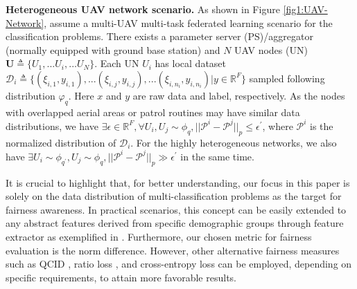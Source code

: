 \documentclass[lettersize,journal]{IEEEtran}
\begin{document}
\textbf{Heterogeneous UAV network scenario.} 
As shown in Figure \ref{fig1:UAV-Network}, assume a multi-UAV multi-task federated learning scenario for the classification problems. There exists a parameter server (PS)/aggregator (normally equipped with ground base station) and $N$ UAV nodes (UN) $\mathbf{U}\triangleq\{U_1,...U_i,...U_N\}$. Each UN $U_i$ has local dataset $\mathcal{D}_i\triangleq\{(\xi_{i,1},y_{i,1}),...(\xi_{i,j},y_{i,j}),...(\xi_{i,n_i},y_{i,n_i})|y\in \mathbb{R}^F\}$ sampled following distribution $\varphi_q$. %
Here $x$ and $y$ are raw data and label, respectively. As the nodes with overlapped aerial areas or patrol routines may have similar data distributions, we have $\exists \epsilon\in \mathbb{R}^F,\forall U_i, U_j \sim \phi_q, ||\mathcal{P}^i-\mathcal{P}^j||_p \leq \epsilon^{\prime}$, where $\mathcal{P}^i$ is the normalized distribution of $\mathcal{D}_i$. For the highly heterogeneous networks, we also have $\exists U_i \sim \phi_{q^{\prime}}, U_j \sim \phi_q,||\mathcal{P}^i-\mathcal{P}^j||_p \gg \epsilon^{\prime}$ in the same time.  

It is crucial to highlight that, for better understanding, our focus in this paper is solely on the data distribution of multi-classification problems as the target for fairness awareness. In practical scenarios, this concept can be easily extended to any abstract features derived from specific demographic groups through feature extractor as exemplified in \cite{shuai2022balancefl}. Furthermore, our chosen metric for fairness evaluation is the norm difference. However, other alternative fairness measures such as QCID \cite{yang2021federated}, ratio loss \cite{wang2021addressing}, and cross-entropy loss \cite{mohri2019agnostic} can be employed, depending on specific requirements, to attain more favorable results.
\end{document}
